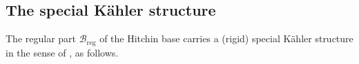\documentclass[12pt,letterpaper,reqno]{article}
\numberwithin{equation}{section}
\newcommand{\cB}{\ensuremath{\mathcal B}}
\newcommand{\cM}{\ensuremath{\mathcal M}}
\newcommand{\kahler}{K\"ahler\xspace}
\newcommand{\hk}{hyperk\"ahler\xspace}
\newcommand{\reg}{\mathrm{reg}}
\DeclareMathOperator{\Tr}{Tr}
\newcommand{\fixme}[1]{{\color{orange}{[#1]}}}
\begin{document}









\subsection{The special \kahler structure}

The regular part $\cB_\reg$ of the Hitchin base 
carries a (rigid) special \kahler structure 
in the sense of \cite{Freed:1997dp}, as follows.
\end{document}

